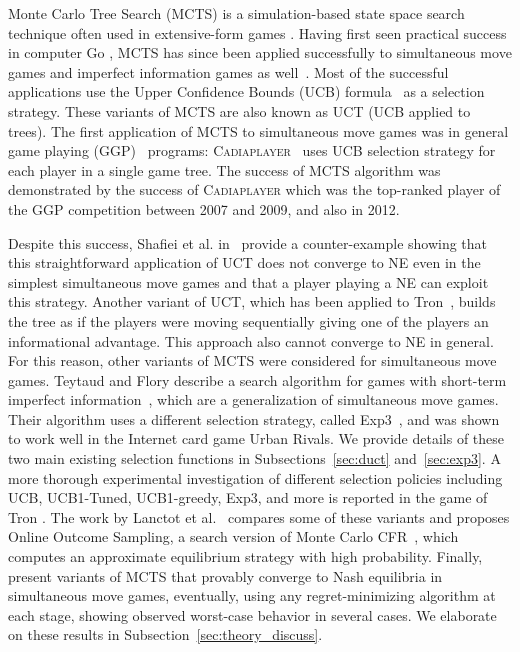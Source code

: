 Monte Carlo Tree Search (MCTS) is a simulation-based state space search technique often used in extensive-form games \cite{Coulom06,UCT}. 
Having first seen practical success in computer Go \cite{Gelly2011,Gelly12}, MCTS has since been applied successfully to simultaneous move games and imperfect information games as well~\cite{Ciancarini10Kriegspiel,Cowling12ISMCTS,15aamas-iioos}. 
Most of the successful applications use the Upper Confidence Bounds (UCB) formula~\cite{UCB} as a selection strategy. These variants of MCTS are also known as UCT (UCB applied to trees). The first application of MCTS to simultaneous move games was in general game playing (GGP)~\cite{GGP} programs: \textsc{Cadiaplayer}~\cite{Cadiaplayer,Finnsson12} uses UCB selection strategy for each player in a single game tree. The success of MCTS algorithm was demonstrated by the success of \textsc{Cadiaplayer} which was the top-ranked player of the GGP competition between 2007 and 2009, and also in 2012.

Despite this success, Shafiei et al. in~\cite{Shafiei09} provide a counter-example showing that this straightforward application of UCT does not
converge to NE even in the simplest simultaneous move games and that a player playing a NE can exploit this strategy. Another variant of UCT, which has been applied to  Tron~\cite{Samothrakis10Tron}, builds the tree as if the players were moving sequentially giving one of the players an informational advantage. This approach also cannot converge to NE in general. For this reason, other variants of MCTS were considered for simultaneous move games. Teytaud and Flory describe a search algorithm for games with short-term imperfect information~\cite{Teytaud11Upper}, which are a generalization of simultaneous move games. Their algorithm uses a different selection strategy, called Exp3~\cite{Auer2003Exp3},
and was shown to work well in the Internet card game Urban Rivals. We provide details of these two main existing selection functions in Subsections~\ref{sec:duct} and~\ref{sec:exp3}.
A more thorough experimental investigation of different selection policies including UCB, UCB1-Tuned, UCB1-greedy, Exp3, and more is reported in the game of Tron \cite{Perick12Comparison}. The work by Lanctot et al.~\cite{Lanctot13Goofspiel} compares some of these variants and proposes Online Outcome Sampling, a search version of Monte Carlo CFR~\cite{Lanctot09Sampling}, which computes an approximate equilibrium strategy with high probability. 
Finally, \cite{lisy2013-nips} present variants of MCTS that provably converge to Nash equilibria in simultaneous move games, eventually, 
using any regret-minimizing algorithm at each stage, showing observed worst-case behavior in several cases. We elaborate on these results in Subsection~\ref{sec:theory_discuss}.

